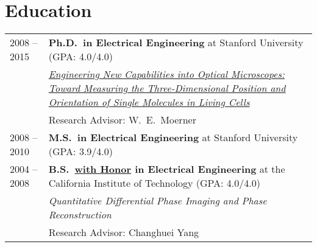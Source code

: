 \documentclass[letter,11pt]{article}
\begin{document}


\section{Education}
\begin{tabularx}{\linewidth}{@{}l X@{}}	
2008 -- 2015 & \textbf{Ph.D.\ in Electrical Engineering} at Stanford University \hfill \normalsize (GPA: 4.0/4.0) \\
    & \href{https://searchworks.stanford.edu/view/10636571}{\textit{Engineering New Capabilities into Optical Microscopes: Toward Measuring the Three-Dimensional Position and Orientation of Single Molecules in Living Cells}} \\
    & Research Advisor: W.\ E.\ Moerner \\

2008 -- 2010 & \textbf{M.S.\ in Electrical Engineering} at Stanford University \hfill \normalsize (GPA: 3.9/4.0) \\

2004 -- 2008 & \textbf{B.S.\ \href{https://resolver.caltech.edu/CaltechCampusPubs:20110511-115217108}{with Honor} in Electrical Engineering} at the California Institute of Technology \hfill \normalsize (GPA: 4.0/4.0) \\
    & \textit{Quantitative Differential Phase Imaging and Phase Reconstruction} \\
    & Research Advisor: Changhuei Yang \\
\end{tabularx}
\end{document}

